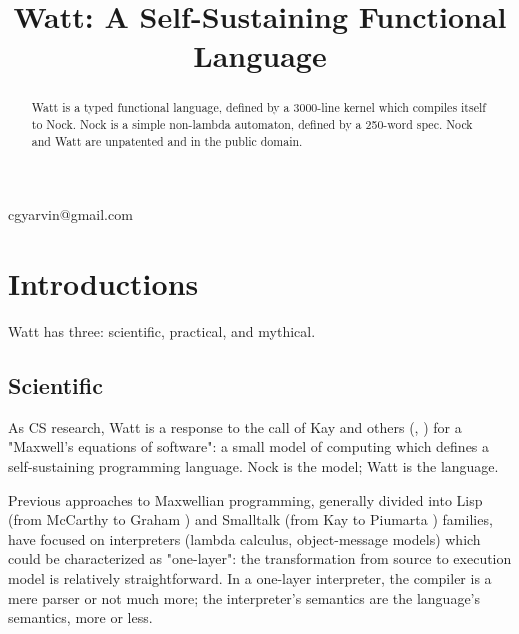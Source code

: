 \documentclass[10pt, nocopyrightspace]{sigplanconf}
\begin{document}


\title{Watt: A Self-Sustaining Functional Language}

           {cgyarvin@gmail.com}

\maketitle

\begin{abstract}

Watt is a typed functional language, defined by a 3000-line
kernel which compiles itself to Nock.  Nock is a simple
non-lambda automaton, defined by a 250-word spec.  Nock and Watt
are unpatented and in the public domain.

\end{abstract}

\section{Introductions}

Watt has three: scientific, practical, and mythical.

\subsection{Scientific}

As CS research, Watt is a response to the call of Kay and others
(\citep{kaymaxwell}, \citep{grahamcore})  for a "Maxwell's
equations of software": a small model of computing which defines
a self-sustaining programming language.  Nock is the model; Watt
is the language.

Previous approaches to Maxwellian programming, generally divided
into Lisp (from McCarthy \citep{mccarthylisp} to Graham
\citep{grahamarc}) and Smalltalk (from Kay \citep{kaysmalltalk} 
to Piumarta \citep{piumartacola})
families, have focused on interpreters (lambda
calculus, object-message models) which could be characterized as
"one-layer": the transformation from source to execution model is
relatively straightforward.  In a one-layer interpreter, the
compiler is a mere parser or not much more; the interpreter's
semantics are the language's semantics, more or less.
\end{document}
